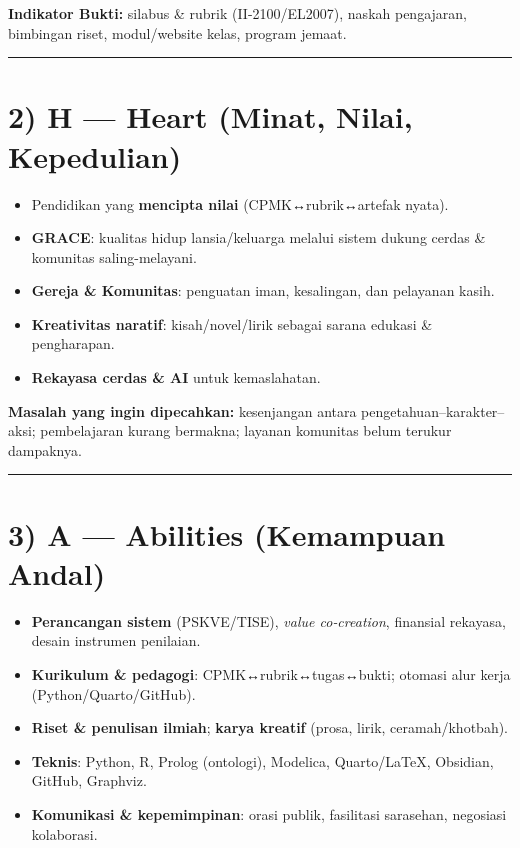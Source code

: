 \documentclass[
  letterpaper,
  DIV=11,
  numbers=noendperiod]{scrreprt}
\providecommand{\tightlist}{%
  \setlength{\itemsep}{0pt}\setlength{\parskip}{0pt}}
\begin{document}
\textbf{Indikator Bukti:} silabus \& rubrik (II-2100/EL2007), naskah
pengajaran, bimbingan riset, modul/website kelas, program jemaat.

\begin{center}\rule{0.5\linewidth}{0.5pt}\end{center}

\section{2) H --- Heart (Minat, Nilai,
Kepedulian)}\label{h-heart-minat-nilai-kepedulian}

\begin{itemize}
\tightlist
\item
  Pendidikan yang \textbf{mencipta nilai} (CPMK↔rubrik↔artefak nyata).
\item
  \textbf{GRACE}: kualitas hidup lansia/keluarga melalui sistem dukung
  cerdas \& komunitas saling-melayani.
\item
  \textbf{Gereja \& Komunitas}: penguatan iman, kesalingan, dan
  pelayanan kasih.
\item
  \textbf{Kreativitas naratif}: kisah/novel/lirik sebagai sarana edukasi
  \& pengharapan.
\item
  \textbf{Rekayasa cerdas \& AI} untuk kemaslahatan.
\end{itemize}

\textbf{Masalah yang ingin dipecahkan:} kesenjangan antara
pengetahuan--karakter--aksi; pembelajaran kurang bermakna; layanan
komunitas belum terukur dampaknya.

\begin{center}\rule{0.5\linewidth}{0.5pt}\end{center}

\section{3) A --- Abilities (Kemampuan
Andal)}\label{a-abilities-kemampuan-andal}

\begin{itemize}
\tightlist
\item
  \textbf{Perancangan sistem} (PSKVE/TISE), \emph{value co‑creation},
  finansial rekayasa, desain instrumen penilaian.
\item
  \textbf{Kurikulum \& pedagogi}: CPMK↔rubrik↔tugas↔bukti; otomasi alur
  kerja (Python/Quarto/GitHub).
\item
  \textbf{Riset \& penulisan ilmiah}; \textbf{karya kreatif} (prosa,
  lirik, ceramah/khotbah).
\item
  \textbf{Teknis}: Python, R, Prolog (ontologi), Modelica, Quarto/LaTeX,
  Obsidian, GitHub, Graphviz.
\item
  \textbf{Komunikasi \& kepemimpinan}: orasi publik, fasilitasi
  sarasehan, negosiasi kolaborasi.
\end{itemize}
\end{document}
